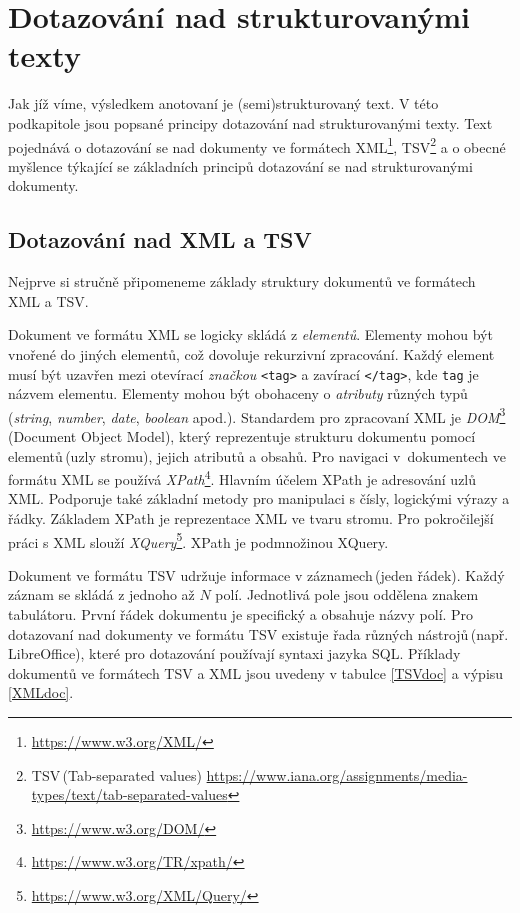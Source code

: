 \section{Dotazování nad strukturovanými texty}
Jak jíž víme, výsledkem anotovaní je (semi)strukturovaný text. V této podkapitole jsou popsané principy dotazování nad strukturovanými texty. Text pojednává o dotazování se nad dokumenty ve formátech XML\footnote{\href{https://www.w3.org/XML/}{https://www.w3.org/XML/}}, TSV\footnote{TSV\,(Tab-separated values) \href{https://www.iana.org/assignments/media-types/text/tab-separated-values}{https://www.iana.org/assignments/media-types/text/tab-separated-values}}  a o obecné myšlence týkající se základních principů dotazování se nad strukturovanými dokumenty.

\subsection{Dotazování nad XML a TSV}
Nejprve si stručně připomeneme základy struktury dokumentů ve formátech XML a TSV.

Dokument ve formátu XML se logicky skládá z \emph{elementů}. Elementy mohou být vnořené do jiných elementů, což dovoluje rekurzivní zpracování. Každý element musí být uzavřen mezi otevírací \emph{značkou} \texttt{<tag>} a zavírací \texttt{</tag>}, kde \texttt{tag} je názvem elementu. Elementy mohou být obohaceny o \emph{atributy} různých typů\,(\textit{string}, \textit{number}, \textit{date}, \textit{boolean} apod.). Standardem pro zpracovaní XML je \emph{DOM}\footnote{\href{https://www.w3.org/DOM/}{https://www.w3.org/DOM/}}\,(Document Object Model), který reprezentuje strukturu dokumentu pomocí elementů\,(uzly stromu), jejich atributů a obsahů. Pro navigaci v~dokumentech ve formátu XML se používá \emph{XPath}\footnote{\href{https://www.w3.org/TR/xpath/}{https://www.w3.org/TR/xpath/}}. Hlavním účelem XPath je adresování uzlů XML. Podporuje také základní metody pro manipulaci s čísly, logickými výrazy a řádky. Základem XPath je reprezentace XML  ve tvaru stromu. Pro pokročilejší práci s XML  slouží \emph{XQuery}\footnote{\href{https://www.w3.org/XML/Query/}{https://www.w3.org/XML/Query/}}. XPath je podmnožinou XQuery.  

Dokument ve formátu TSV udržuje informace v záznamech\,(jeden řádek).  Každý záznam se skládá z jednoho až $N$ polí. Jednotlivá pole jsou oddělena znakem tabulátoru. První řádek dokumentu je specifický a obsahuje názvy polí. Pro dotazovaní nad dokumenty ve formátu TSV existuje řada různých nástrojů\,(např. LibreOffice), které  pro dotazování používají syntaxi jazyka SQL. Příklady dokumentů ve formátech TSV a XML jsou uvedeny v tabulce \ref{TSVdoc} a výpisu \ref{XMLdoc}.

